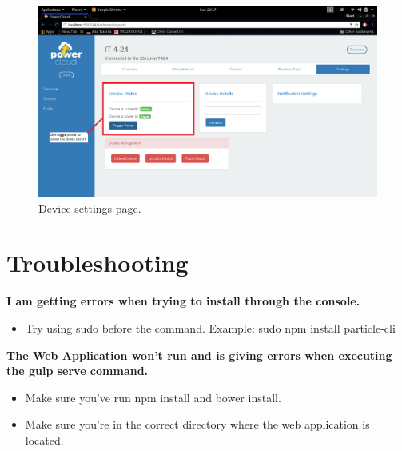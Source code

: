 \documentclass[a4paper,10pt]{article}
\begin{document}
	\begin{figure}[H]
		\includegraphics[width=\textwidth]{images/settings.png}
		\caption{Device settings page. \label{overflow}}
	\end{figure}
	
	\newpage
	\section{Troubleshooting}
	\textbf{I am getting errors when trying to install through the console.}
	\begin{itemize}
		\item Try using sudo before the command. Example: sudo npm install particle-cli
	\end{itemize}
	
	\textbf{The Web Application won't run and is giving errors when executing the gulp serve command.} 
	\begin{itemize}
		\item Make sure you've run npm install and bower install.
		\item Make sure you're in the correct directory where the web application is located.
	\end{itemize}
\end{document}
